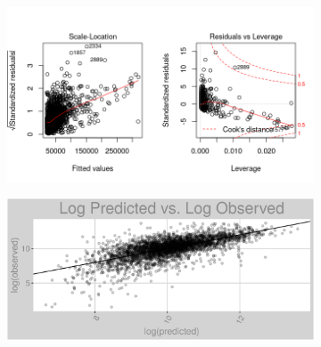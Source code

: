 \begin{figure}[h]
\centering
\begin{subfigure}{1\textwidth}
\centering
\includegraphics[width=.99\textwidth, height=0.425\textheight]{Images/natural_gas_psf_pls_res_2.png}
\end{subfigure}
\begin{subfigure}{1\textwidth}
\centering
\includegraphics[width=.99\textwidth, height=0.475\textheight]{Images/natural_gas_psf_pls_pvo.png}
\end{subfigure}
\end{figure}
\FloatBarrier
\newpage
